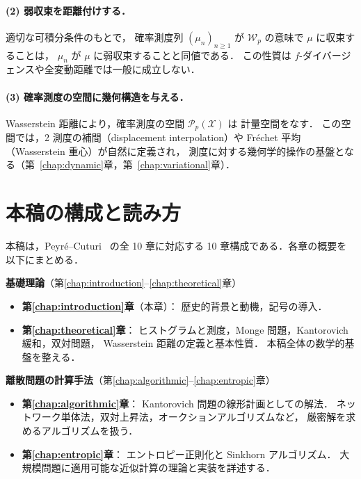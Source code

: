 \paragraph{(2) 弱収束を距離付けする．}
適切な可積分条件のもとで，
確率測度列 $(\mu_n)_{n \geq 1}$ が $\mathcal{W}_p$ の意味で $\mu$ に収束することは，
$\mu_n$ が $\mu$ に弱収束することと同値である．
この性質は $f$-ダイバージェンスや全変動距離では一般に成立しない．

\paragraph{(3) 確率測度の空間に幾何構造を与える．}
Wasserstein 距離により，確率測度の空間 $\mathcal{P}_p(\mathcal{X})$ は
計量空間をなす．
この空間では，2 測度の補間（displacement interpolation）や
Fréchet 平均（Wasserstein 重心）が自然に定義され，
測度に対する幾何学的操作の基盤となる（第~\ref{chap:dynamic}章，第~\ref{chap:variational}章）．


\section{本稿の構成と読み方}\label{sec:outline}

本稿は，Peyré--Cuturi~\cite{PeyreCuturi2019} の全 10 章に対応する
10 章構成である．各章の概要を以下にまとめる．

\medskip

\noindent
\textbf{基礎理論}（第\ref{chap:introduction}--\ref{chap:theoretical}章）
\begin{itemize}
  \item \textbf{第\ref{chap:introduction}章}（本章）：
    歴史的背景と動機，記号の導入．
  \item \textbf{第\ref{chap:theoretical}章}：
    ヒストグラムと測度，Monge 問題，Kantorovich 緩和，双対問題，
    Wasserstein 距離の定義と基本性質．
    本稿全体の数学的基盤を整える．
\end{itemize}

\medskip

\noindent
\textbf{離散問題の計算手法}（第\ref{chap:algorithmic}--\ref{chap:entropic}章）
\begin{itemize}
  \item \textbf{第\ref{chap:algorithmic}章}：
    Kantorovich 問題の線形計画としての解法．
    ネットワーク単体法，双対上昇法，オークションアルゴリズムなど，
    厳密解を求めるアルゴリズムを扱う．
  \item \textbf{第\ref{chap:entropic}章}：
    エントロピー正則化と Sinkhorn アルゴリズム．
    大規模問題に適用可能な近似計算の理論と実装を詳述する．
\end{itemize}

